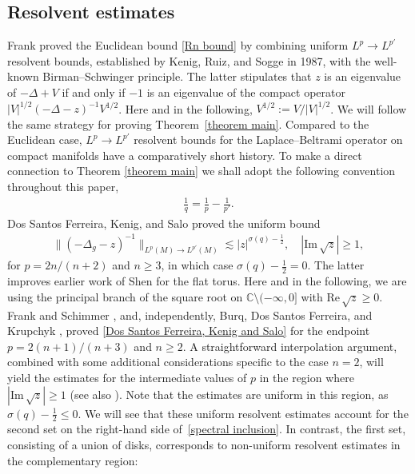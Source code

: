 \documentclass[12pt]{amsart}
\newcommand{\C}{{\mathbb C}}
\newcommand\re{\mathrm{Re}\,}
\newcommand\im{\mathrm{Im}\,}
\begin{document}
\subsection{Resolvent estimates}\label{Subsection intro: resolvent estimates}
Frank \cite{MR2820160} proved the Euclidean bound \eqref{Rn bound} by combining uniform $L^p\to L^{p'}$ resolvent bounds, established by Kenig, Ruiz, and Sogge \cite{MR894584} in 1987, with the well-known Birman--Schwinger principle. The latter stipulates that $z$ is an eigenvalue of $-\Delta+V$ if and only if $-1$ is an eigenvalue of the compact operator $|V|^{1/2}(-\Delta-z)^{-1}V^{1/2}$. Here and in the following, $V^{1/2}:=V/|V|^{1/2}$. We will follow the same strategy for proving Theorem~\ref{theorem main}. Compared to the Euclidean case, $L^p\to L^{p'}$ resolvent bounds for the Laplace--Beltrami operator on compact manifolds have a comparatively short history. To make a direct connection to Theorem \ref{theorem main} we shall adopt the following convention throughout this paper,
\begin{align}\label{1/q=1/p-1/p'}
     \frac{1}{q}=\frac{1}{p}-\frac{1}{p'}.
\end{align}
Dos Santos Ferreira, Kenig, and Salo \cite{MR3200351} proved the uniform bound 
\begin{align}\label{Dos Santos Ferreira, Kenig and Salo}
\|(-\Delta_g-z)^{-1}\|_{L^{p}(M)\to L^{p'}(M)}\lesssim|z|^{\sigma(q)-\frac{1}{2}},\quad |\im\sqrt{z}|\geq 1,
\end{align}
for $p=2n/(n+2)$ and $n\geq 3$, in which case $\sigma(q)-\frac{1}{2}=0$. The latter improves earlier work of Shen \cite{MR2366961} for the flat torus. Here and in the following, we are using the principal branch of the square root on $\C\setminus (-\infty,0]$ with $\re\sqrt{z}\geq 0$. Frank and Schimmer \cite{MR3620715}, and, independently, Burq, Dos Santos Ferreira, and Krupchyk \cite{MR3848231}, proved \eqref{Dos Santos Ferreira, Kenig and Salo} for the endpoint $p=2(n+1)/(n+3)$ and $n\geq 2$. A straightforward interpolation argument, combined with some additional considerations specific to the case  $n=2$, will yield the estimates for the intermediate values of $p$ in the region where $|\im \sqrt{z}| \geq 1$ (see also \cite[Remark 9]{MR3620715}). Note that the estimates are uniform in this region, as $\sigma(q)-\frac{1}{2}\leq 0$. We will see that these uniform resolvent estimates account for the second set on the right-hand side of~\eqref{spectral inclusion}. In contrast, the first set, consisting of a union of disks, corresponds to non-uniform resolvent estimates in the complementary region:
\end{document}

